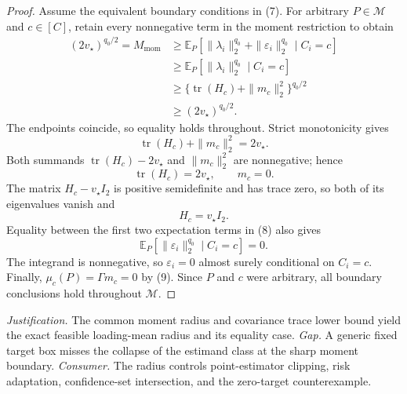 \documentclass{article}
\begin{document}
\begin{proof}
Assume the equivalent boundary conditions in (7). For arbitrary \(P\in\mathcal M\) and \(c\in[C]\), retain every nonnegative term in the moment restriction to obtain
\[
\begin{aligned}
(2v_\star)^{q_0/2}=M_{\mathrm{mom}}
&\geq\mathbb E_P[\|\lambda_i\|_2^{q_0}+\|\varepsilon_i\|_2^{q_0}\mid C_i=c]\\
&\geq\mathbb E_P[\|\lambda_i\|_2^{q_0}\mid C_i=c]\\
&\geq\{\operatorname{tr}(H_c)+\|m_c\|_2^2\}^{q_0/2}\\
&\geq(2v_\star)^{q_0/2}.
\end{aligned}
\tag{8}
\]
The endpoints coincide, so equality holds throughout. Strict monotonicity gives
\[
\operatorname{tr}(H_c)+\|m_c\|_2^2=2v_\star.
\]
Both summands \(\operatorname{tr}(H_c)-2v_\star\) and \(\|m_c\|_2^2\) are nonnegative; hence
\[
\operatorname{tr}(H_c)=2v_\star,
\qquad
m_c=0.
\tag{9}
\]
The matrix \(H_c-v_\star I_2\) is positive semidefinite and has trace zero, so both of its eigenvalues vanish and
\[
H_c=v_\star I_2.
\tag{10}
\]
Equality between the first two expectation terms in (8) also gives
\[
\mathbb E_P[\|\varepsilon_i\|_2^{q_0}\mid C_i=c]=0.
\]
The integrand is nonnegative, so \(\varepsilon_i=0\) almost surely conditional on \(C_i=c\). Finally, \(\mu_c(P)=\Gamma m_c=0\) by (9). Since \(P\) and \(c\) were arbitrary, all boundary conclusions hold throughout \(\mathcal M\).
\end{proof}
\par\smallskip\noindent \textit{Justification.} The common moment radius and covariance trace lower bound yield the exact feasible loading-mean radius and its equality case. \textit{Gap.} A generic fixed target box misses the collapse of the estimand class at the sharp moment boundary. \textit{Consumer.} The radius controls point-estimator clipping, risk adaptation, confidence-set intersection, and the zero-target counterexample.
\end{document}

